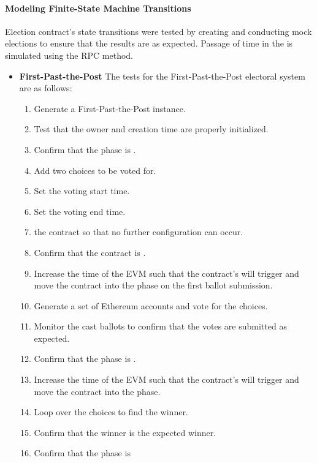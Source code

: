\paragraph{Modeling Finite-State Machine Transitions}
Election contract's state transitions were tested by creating and conducting
mock elections to ensure that the results are as expected. Passage of time in
the  is simulated using the  RPC
method.\cite{testrpc}

\begin{itemize}
  \item \textbf{First-Past-the-Post} The tests for the First-Past-the-Post
    electoral system are as follows:
    \begin{enumerate}
      \item Generate a First-Past-the-Post instance.
      \item Test that the owner and creation time are properly initialized.
      \item Confirm that the phase is .
      \item Add two choices to be voted for.
      \item Set the voting start time.
      \item Set the voting end time.
      \item {} the contract so that no further configuration can occur.
      \item Confirm that the contract is .
      \item Increase the time of the EVM such that the contract's
         will trigger and move the contract into the
         phase on the first ballot submission.
      \item Generate a set of Ethereum accounts and vote for the choices.
      \item Monitor the cast ballots to confirm that the votes are submitted as
        expected.
      \item Confirm that the phase is .
      \item Increase the time of the EVM such that the contract's
         will trigger and move the contract into the
         phase.
      \item Loop over the choices to find the winner.
      \item Confirm that the winner is the expected winner.
      \item Confirm that the phase is 
    \end{enumerate}


\end{itemize}
